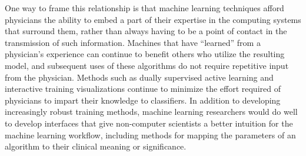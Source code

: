 \documentclass[12pt]{article} %
\begin{document}
One way to frame this relationship is that machine learning techniques afford physicians the ability to embed a part of their expertise in the computing systems that surround them, rather than always having to be a point of contact in the transmission of such information.
Machines that have ``learned'' from a physician's experience can continue to benefit others who utilize the resulting model, and subsequent uses of these algorithms do not require repetitive input from the physician.
Methods such as dually supervised active learning and interactive training visualizations continue to minimize the effort required of physicians to impart their knowledge to classifiers.
In addition to developing increasingly robust training methods, machine learning researchers would do well to develop interfaces that give non-computer scientists a better intuition for  the machine learning workflow, including methods for mapping the parameters of an algorithm to their clinical meaning or significance.




\newpage


\end{document}
